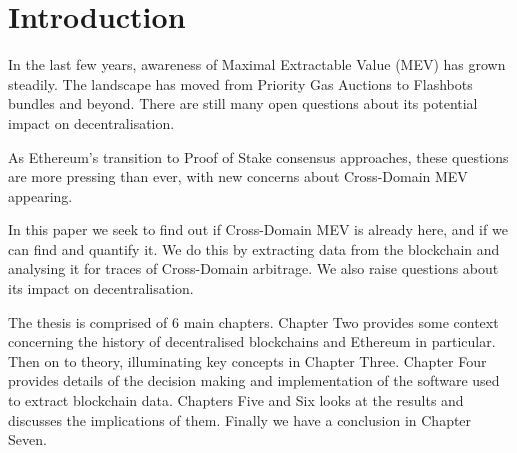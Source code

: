 \chapter{Introduction}

In the last few years, awareness of Maximal Extractable Value (MEV) has grown steadily. The landscape has moved from Priority Gas Auctions to Flashbots bundles and beyond. There are still many open questions about its potential impact on decentralisation.  

As Ethereum's transition to Proof of Stake consensus approaches, these questions are more pressing than ever, with new concerns about Cross-Domain MEV \cite{crossdomainMEV} appearing. 

In this paper we seek to find out if Cross-Domain MEV is already here, and if we can find and quantify it. We do this by extracting data from the blockchain and analysing it for traces of Cross-Domain arbitrage. We also raise questions about its impact on decentralisation. 

The thesis is comprised of 6 main chapters. Chapter Two provides some context concerning the history of decentralised blockchains and Ethereum in particular. Then on to theory, illuminating key concepts in Chapter Three. Chapter Four provides details of the decision making and implementation of the software used to extract blockchain data. Chapters Five and Six looks at the results and discusses the implications of them. Finally we have a conclusion in Chapter Seven.